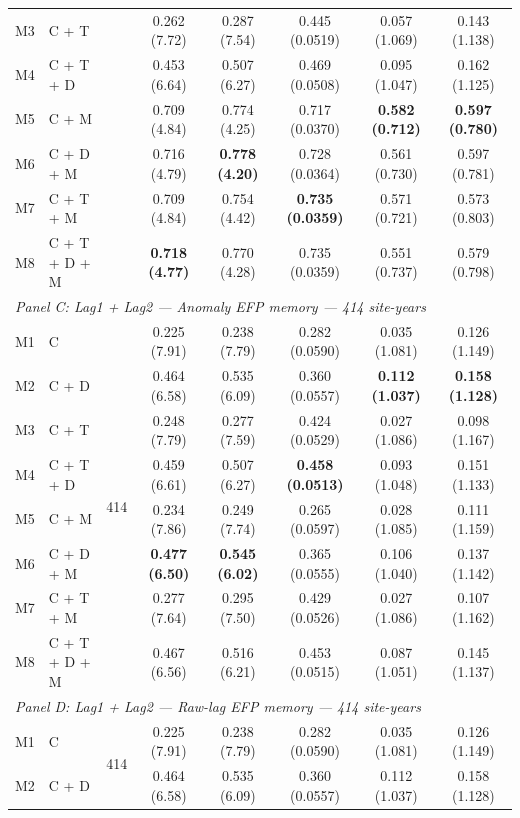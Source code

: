 \begin{table}[htbp]
\begin{tabular}{llcccccc}
M3 & C + T &  & 0.262 (7.72) & 0.287 (7.54) & 0.445 (0.0519) & 0.057 (1.069) & 0.143 (1.138) \\
M4 & C + T + D &  & 0.453 (6.64) & 0.507 (6.27) & 0.469 (0.0508) & 0.095 (1.047) & 0.162 (1.125) \\
M5 & C + M &  & 0.709 (4.84) & 0.774 (4.25) & 0.717 (0.0370) & \textbf{0.582 (0.712)} & \textbf{0.597 (0.780)} \\
M6 & C + D + M &  & 0.716 (4.79) & \textbf{0.778 (4.20)} & 0.728 (0.0364) & 0.561 (0.730) & 0.597 (0.781) \\
M7 & C + T + M &  & 0.709 (4.84) & 0.754 (4.42) & \textbf{0.735 (0.0359)} & 0.571 (0.721) & 0.573 (0.803) \\
M8 & C + T + D + M &  & \textbf{0.718 (4.77)} & 0.770 (4.28) & 0.735 (0.0359) & 0.551 (0.737) & 0.579 (0.798) \\
\midrule
\multicolumn{8}{l}{\textit{Panel C: Lag1 + Lag2 --- Anomaly EFP memory --- 414 site-years}} \\
\midrule
M1 & C & \multirow{8}{*}{414} & 0.225 (7.91) & 0.238 (7.79) & 0.282 (0.0590) & 0.035 (1.081) & 0.126 (1.149) \\
M2 & C + D &  & 0.464 (6.58) & 0.535 (6.09) & 0.360 (0.0557) & \textbf{0.112 (1.037)} & \textbf{0.158 (1.128)} \\
M3 & C + T &  & 0.248 (7.79) & 0.277 (7.59) & 0.424 (0.0529) & 0.027 (1.086) & 0.098 (1.167) \\
M4 & C + T + D &  & 0.459 (6.61) & 0.507 (6.27) & \textbf{0.458 (0.0513)} & 0.093 (1.048) & 0.151 (1.133) \\
M5 & C + M &  & 0.234 (7.86) & 0.249 (7.74) & 0.265 (0.0597) & 0.028 (1.085) & 0.111 (1.159) \\
M6 & C + D + M &  & \textbf{0.477 (6.50)} & \textbf{0.545 (6.02)} & 0.365 (0.0555) & 0.106 (1.040) & 0.137 (1.142) \\
M7 & C + T + M &  & 0.277 (7.64) & 0.295 (7.50) & 0.429 (0.0526) & 0.027 (1.086) & 0.107 (1.162) \\
M8 & C + T + D + M &  & 0.467 (6.56) & 0.516 (6.21) & 0.453 (0.0515) & 0.087 (1.051) & 0.145 (1.137) \\
\midrule
\multicolumn{8}{l}{\textit{Panel D: Lag1 + Lag2 --- Raw-lag EFP memory --- 414 site-years}} \\
\midrule
M1 & C & \multirow{8}{*}{414} & 0.225 (7.91) & 0.238 (7.79) & 0.282 (0.0590) & 0.035 (1.081) & 0.126 (1.149) \\
M2 & C + D &  & 0.464 (6.58) & 0.535 (6.09) & 0.360 (0.0557) & 0.112 (1.037) & 0.158 (1.128) \\

\end{tabular}
\end{table}
